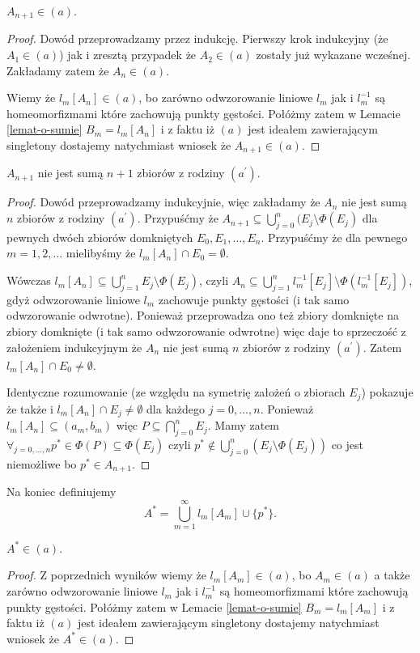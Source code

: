 \documentclass[12pt]{amsart}
\theoremstyle{plain}
\theoremstyle{definition}
\theoremstyle{remark}
\newcommand{\aideal}{\mathit{(a)}}
\newcommand{\aidealprime}{\mathit{(a^\prime)}}
\begin{document}
 $A_{n+1} \in \aideal$.
\begin{proof}
Dowód przeprowadzamy przez indukcję. Pierwszy krok indukcyjny 
(że $A_1 \in \aideal$) jak i zresztą przypadek że
$A_2 \in \aideal$ zostały już wykazane wcześnej. 
Zakładamy zatem że $A_n \in \aideal$.

Wiemy że $l_m[A_n] \in \aideal$, bo zarówno odwzorowanie liniowe $l_m$
jak i $l_m^{-1}$ są homeomorfizmami które zachowują punkty gęstości.
Połóżmy zatem w Lemacie \ref{lemat-o-sumie} 
$B_m = l_m[A_n]$ i z faktu iż $\aideal$ jest ideałem
zawierającym singletony dostajemy natychmiast wniosek
że $A_{n+1} \in \aideal$.
\end{proof}

 $A_{n+1}$ nie jest sumą $n + 1$ zbiorów z rodziny $\aidealprime$.
\begin{proof}
Dowód przeprowadzamy indukcyjnie, więc zakładamy że $A_n$ nie jest sumą
$n$ zbiorów z rodziny $\aidealprime$.
Przypuśćmy że $A_{n+1} \subseteq \bigcup_{j=0}^n (E_j \setminus \Phi(E_j)$
dla pewnych dwóch zbiorów domkniętych $E_0, E_1, \ldots, E_n$.  Przypuśćmy że dla pewnego 
$m = 1,2,\ldots$ mielibyśmy że $l_m[A_n] \cap E_0 = \emptyset$.

Wówczas $l_m[A_n] \subseteq \bigcup_{j=1}^n E_j \setminus \Phi(E_j)$, czyli 
$A_n \subseteq \bigcup_{j=1}^n l_m^{-1}[E_j] \setminus \Phi(l_m^{-1}[E_j])$, gdyż
odwzorowanie liniowe $l_m$ zachowuje punkty gęstości (i tak samo odwzorowanie odwrotne). Ponieważ 
przeprowadza ono też zbiory domknięte na zbiory domknięte (i tak samo odwzorowanie odwrotne)
więc daje to sprzeczość z założeniem indukcyjnym że $A_n$ nie jest sumą $n$ zbiorów z rodziny $\aidealprime$.
Zatem $l_m[A_n] \cap E_0 \not= \emptyset$.

Identyczne rozumowanie (ze względu na symetrię założeń o zbiorach $E_j$)
pokazuje że także i $l_m[A_n] \cap E_j \not= \emptyset$
dla każdego $j = 0, \ldots, n$.
Ponieważ $l_m[A_n] \subseteq (a_m, b_m)$
więc $P \subseteq \bigcap_{j=0}^n E_j$. 
Mamy zatem $\forall_{j=0,\ldots, n} p^* \in \Phi(P) \subseteq \Phi(E_j)$
czyli $p^* \not\in \bigcup_{j=0}^n (E_j \setminus \Phi(E_j))$
co jest niemożliwe bo $p^* \in A_{n+1}$.
\end{proof}

Na koniec definiujemy 
\[ A^* = \bigcup_{m=1}^{\infty} l_m[A_m] \cup \lbrace p^* \rbrace.
\]

 $A^* \in \aideal$.
\begin{proof}
Z poprzednich wyników wiemy że $l_m[A_m] \in \aideal$, bo 
$A_m \in \aideal$ a także zarówno odwzorowanie liniowe $l_m$
jak i $l_m^{-1}$ są homeomorfizmami które zachowują punkty gęstości.
Połóżmy zatem w Lemacie \ref{lemat-o-sumie} 
$B_m = l_m[A_m]$ i z faktu iż $\aideal$ jest ideałem
zawierającym singletony dostajemy natychmiast wniosek
że $A^* \in \aideal$.
\end{proof}
\end{document}

